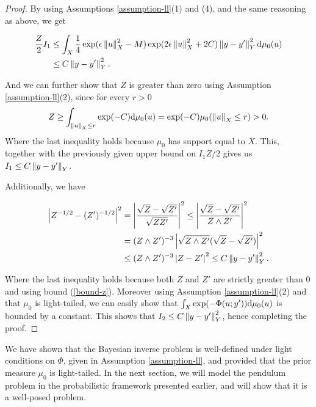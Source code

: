 \begin{proof}
  By using Assumptions \ref{assumption-ll}(1) and (4), and the same reasoning as above, we get

  \begin{equation*}
    \begin{aligned}
      \frac{Z}2I_1 &\le \int_X\frac14\exp(\epsilon\left\lVert u\right\rVert_X^2 - M)\exp(2\epsilon\left\lVert u\right\rVert_X^2 + 2C)\left\lVert y - y'\right\rVert_Y^2 \text{d}\mu_0(u)\\
        & \le C\left\lVert y - y'\right\rVert_Y^2.
    \end{aligned}
  \end{equation*}

  And we can further show that $Z$ is greater than zero using Assumption \ref{assumption-ll}(2), since for every $r > 0$
  \begin{equation*}
    Z \ge \int_{\left\lVert u\right\rVert_X \le r}\exp(-C)\text{d}\mu_0(u) = \exp(-C)\mu_0(\left\lVert u\right\rVert_X \le r) > 0.
  \end{equation*}
  Where the last inequality holds because $\mu_0$ has support equal to $X$. This, together with the previously given upper bound on $I_1 Z/2$ gives us $I_1 \le C\left\lVert y - y'\right\rVert_Y$.

  Additionally, we have

  \begin{align*}
    \left|Z^{-1/2} - (Z')^{-1/2}\right|^2
    &= \left|\frac{\sqrt{Z} - \sqrt{Z'}}{\sqrt{ZZ'}}\right|^2 \leq \left|\frac{\sqrt{Z} - \sqrt{Z'}}{Z \land Z'}\right|^2 \\
    &= (Z \land Z')^{-3}\left|\sqrt{Z \land Z'}(\sqrt{Z} - \sqrt{Z'})\right|^2\\
    &\le (Z \land Z')^{-3}\left|Z - Z'\right|^2 \le C\left\lVert y - y'\right\rVert_Y^2.
  \end{align*}

  Where the last inequality holds because both $Z$ and $Z'$ are strictly greater than $0$ and using bound (\ref{bound-z}). Moreover using Assumption \ref{assumption-ll}(2) and that $\mu_0$ is light-tailed, we can easily show that $\int_X\exp(-\Phi(u; y'))\text{d}\mu_0(u)$ is bounded by a constant. This shows that $I_2 \le C\left\lVert y - y'\right\rVert_Y^2$, hence completing the proof.
\end{proof}

We have shown that the Bayesian inverse problem is well-defined under light conditions on $\Phi$, given in Assumption \ref{assumption-ll}, and provided that the prior measure $\mu_0$ is light-tailed. In the next section, we will model the pendulum problem in the probabilistic framework presented earlier, and will show that it is a well-posed problem.

